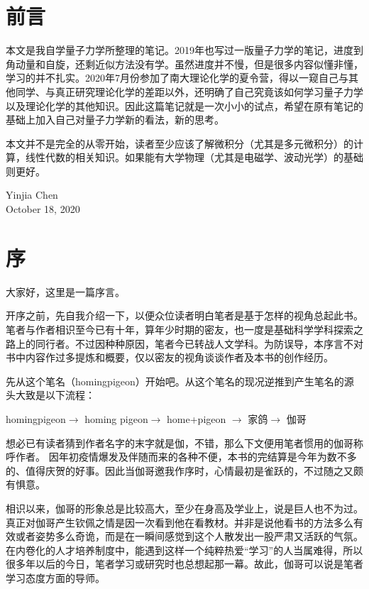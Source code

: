 \documentclass[cn,11pt,chinese,toc= twocol]{elegantbook}
\begin{document}
\chapter*{前言}
本文是我自学量子力学所整理的笔记。2019年也写过一版量子力学的笔记，进度到角动量和自旋，还剩近似方法没有学。虽然进度并不慢，但是很多内容似懂非懂，学习的并不扎实。2020年7月份参加了南大理论化学的夏令营，得以一窥自己与其他同学、与真正研究理论化学的差距以外，还明确了自己究竟该如何学习量子力学以及理论化学的其他知识。因此这篇笔记就是一次小小的试点，希望在原有笔记的基础上加入自己对量子力学新的看法，新的思考。

本文并不是完全的从零开始，读者至少应该了解微积分（尤其是多元微积分）的计算，线性代数的相关知识。如果能有大学物理（尤其是电磁学、波动光学）的基础则更好。

\vskip 1.5cm

\begin{flushright}
Yinjia Chen\\
October 18, 2020
\end{flushright}

\chapter*{序}
大家好，这里是一篇序言。

开序之前，先自我介绍一下，以便众位读者明白笔者是基于怎样的视角总起此书。笔者与作者相识至今已有十年，算年少时期的密友，也一度是基础科学学科探索之路上的同行者。不过因种种原因，笔者今已转战人文学科。为防误导，本序言不对书中内容作过多提炼和概要，仅以密友的视角谈谈作者及本书的创作经历。

先从这个笔名（homingpigeon）开始吧。从这个笔名的现况逆推到产生笔名的源头大致是以下流程：

\begin{center}
  homingpigeon$\rightarrow$ homing pigeon$\rightarrow$ home+pigeon $\rightarrow$ 家鸽$\rightarrow$ 伽哥
\end{center}

想必已有读者猜到作者名字的末字就是伽，不错，那么下文便用笔者惯用的伽哥称呼作者。
因年初疫情爆发及伴随而来的各种不便，本书的完结算是今年为数不多的、值得庆贺的好事。因此当伽哥邀我作序时，心情最初是雀跃的，不过随之又颇有惧意。

相识以来，伽哥的形象总是比较高大，至少在身高及学业上，说是巨人也不为过。真正对伽哥产生钦佩之情是因一次看到他在看教材。并非是说他看书的方法多么有效或者姿势多么奇诡，而是在一瞬间感觉到这个人散发出一股严肃又活跃的气氛。在内卷化的人才培养制度中，能遇到这样一个纯粹热爱“学习”的人当属难得，所以很多年以后的今日，笔者学习或研究时也总想起那一幕。故此，伽哥可以说是笔者学习态度方面的导师。
\end{document}
